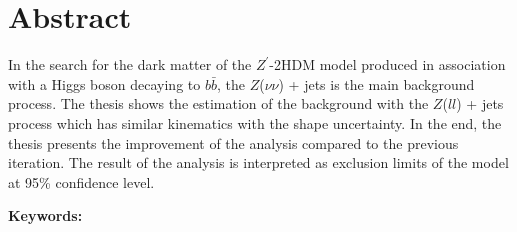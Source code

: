 \documentclass[class=NTHU_thesis, crop=false]{standalone}
\begin{document}
\chapter{Abstract}
In the search for the dark matter of the $Z^\prime$-2HDM model produced in association with a Higgs boson decaying to $b\bar{b}$, the $Z$($\nu\nu$) + jets is the main background process. The thesis shows the estimation of the background with the $Z$($ll$) + jets process which has similar kinematics with the shape uncertainty. In the end, the thesis presents the improvement of the analysis compared to the previous iteration. The result of the analysis is interpreted as exclusion limits of the model at 95\% confidence level.

\vspace{2em}
\noindent \textbf{Keywords:} \keywordsEn{} %
\end{document}
